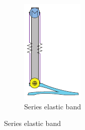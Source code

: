\begin{figure}[hb!]
\begin{subfigure}{.19\textwidth}
      \includegraphics[width=\linewidth]{figures/illustration_serial_elastic_band.pdf}
      \caption{Series elastic band}
      \label{fig:series_elastic_band}
    \end{subfigure}
  \end{figure}  


